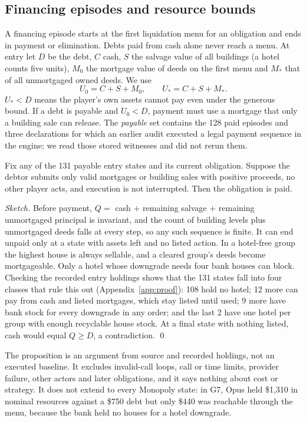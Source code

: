 \documentclass[10pt,twocolumn,letterpaper]{article}
\begin{document}
\subsection{Financing episodes and resource bounds}
A financing episode starts at the first liquidation menu for an obligation and ends in payment or elimination. Debts paid from cash alone never reach a menu. At entry let $D$ be the debt, $C$ cash, $S$ the salvage value of all buildings (a hotel counts five units), $M_0$ the mortgage value of deeds on the first menu and $M_*$ that of all unmortgaged owned deeds. We use
\[U_0=C+S+M_0,\qquad U_*=C+S+M_*.\]
$U_*<D$ means the player's own assets cannot pay even under the generous bound. If a debt is payable and $U_0<D$, payment must use a mortgage that only a building sale can release. The \emph{payable} set contains the 128 paid episodes and three declarations for which an earlier audit executed a legal payment sequence in the engine; we read those stored witnesses and did not rerun them.

\begin{proposition}\label{prop:continue}
Fix any of the 131 payable entry states and its current obligation. Suppose the debtor submits only valid mortgages or building sales with positive proceeds, no other player acts, and execution is not interrupted. Then the obligation is paid.
\end{proposition}
\noindent\emph{Sketch.} Before payment, $Q=$ cash $+$ remaining salvage $+$ remaining unmortgaged principal is invariant, and the count of building levels plus unmortgaged deeds falls at every step, so any such sequence is finite. It can end unpaid only at a state with assets left and no listed action. In a hotel-free group the highest house is always sellable, and a cleared group's deeds become mortgageable. Only a hotel whose downgrade needs four bank houses can block. Checking the recorded entry holdings shows that the 131 states fall into four classes that rule this out (Appendix~\ref{app:proof}): 108 hold no hotel; 12 more can pay from cash and listed mortgages, which stay listed until used; 9 more have bank stock for every downgrade in any order; and the last 2 have one hotel per group with enough recyclable house stock. At a final state with nothing listed, cash would equal $Q\ge D$, a contradiction. \qed

The proposition is an argument from source and recorded holdings, not an executed baseline. It excludes invalid-call loops, call or time limits, provider failure, other actors and later obligations, and it says nothing about cost or strategy. It does not extend to every Monopoly state: in G7, Opus held \$1,310 in nominal resources against a \$750 debt but only \$440 was reachable through the menu, because the bank held no houses for a hotel downgrade.
\end{document}
